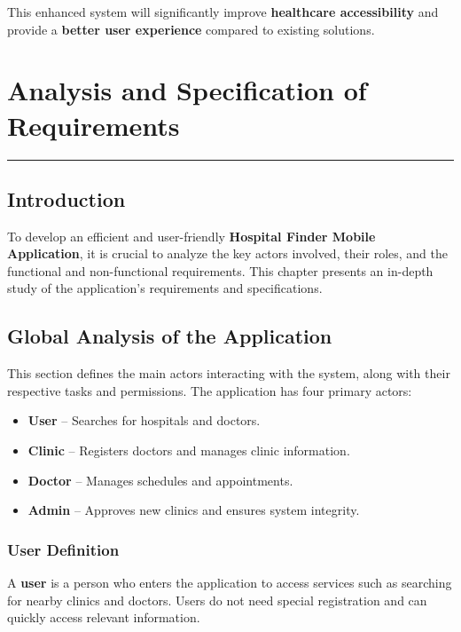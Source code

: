 \documentclass[12pt]{report}
\begin{document}
\noindent This enhanced system will significantly improve \textbf{healthcare accessibility} and provide a \textbf{better user experience} compared to existing solutions.











\newpage

\chapter{\textbf{Analysis and Specification of Requirements}}  
\rule{\linewidth}{1.5pt}  %

\section{\textbf{Introduction}}  

\noindent To develop an efficient and user-friendly \textbf{Hospital Finder Mobile Application}, it is crucial to analyze the key actors involved, their roles, and the functional and non-functional requirements. This chapter presents an in-depth study of the application’s requirements and specifications.

\section{\textbf{Global Analysis of the Application}}  

\noindent This section defines the main actors interacting with the system, along with their respective tasks and permissions. The application has four primary actors:  
\begin{itemize}  
    \item \textbf{User} – Searches for hospitals and doctors.  
    \item \textbf{Clinic} – Registers doctors and manages clinic information.  
    \item \textbf{Doctor} – Manages schedules and appointments.  
    \item \textbf{Admin} – Approves new clinics and ensures system integrity.  
\end{itemize}  

\subsection{\textbf{User Definition}}  
\noindent A \textbf{user} is a person who enters the application to access services such as searching for nearby clinics and doctors. Users do not need special registration and can quickly access relevant information.  
\end{document}
